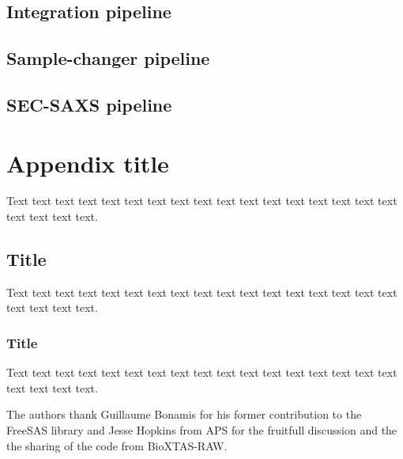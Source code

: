 \documentclass[preprint]{iucr}              %
\begin{document}
\subsection{Integration pipeline}
\subsection{Sample-changer pipeline}
\subsection{SEC-SAXS pipeline}


\appendix
\section{Appendix title}

Text text text text text text text text text text text text text text
text text text text text text text.

\subsection{Title}

Text text text text text text text text text text text text text text
text text text text text text text.

\subsubsection{Title}

Text text text text text text text text text text text text text text
text text text text text text text.




The authors thank Guillaume Bonamis for his former contribution to the FreeSAS library and Jesse Hopkins from APS for the fruitfull 
discussion and the the sharing of the code from BioXTAS-RAW.

\end{document}
